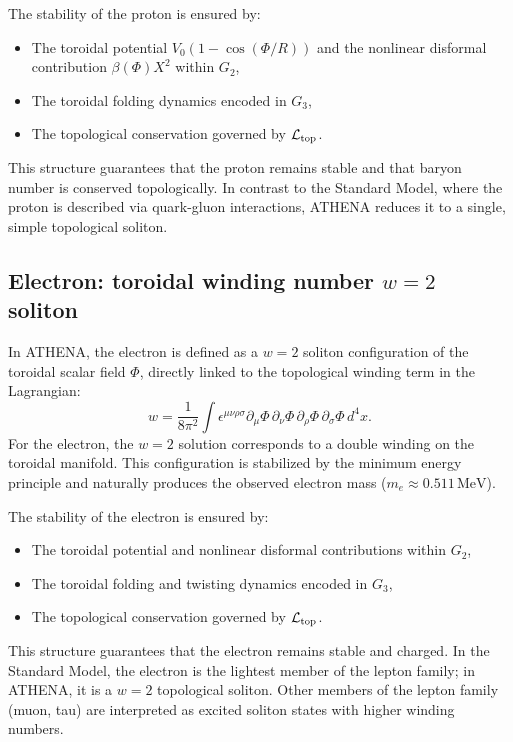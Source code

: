 \documentclass[11pt,a4paper]{article}
\begin{document}
The stability of the proton is ensured by:
\begin{itemize}
    \item The toroidal potential \(V_0 (1 - \cos(\Phi / R))\) and the nonlinear disformal contribution \(\beta(\Phi) X^2\) within \(G_2\),
    \item The toroidal folding dynamics encoded in \(G_3\),
    \item The topological conservation governed by \(\mathcal{L}_{\rm top}\).
\end{itemize}
This structure guarantees that the proton remains stable and that baryon number is conserved topologically. In contrast to the Standard Model, where the proton is described via quark-gluon interactions, ATHENA reduces it to a single, simple topological soliton.

\subsection{Electron: toroidal winding number \(w=2\) soliton}
\label{subsec:electron}
In ATHENA, the electron is defined as a \(w=2\) soliton configuration of the toroidal scalar field \(\Phi\), directly linked to the topological winding term in the Lagrangian:
\[
w = \frac{1}{8\pi^2} \int \epsilon^{\mu\nu\rho\sigma} \partial_\mu \Phi \, \partial_\nu \Phi \, \partial_\rho \Phi \, \partial_\sigma \Phi \, d^4x.
\]
For the electron, the \(w=2\) solution corresponds to a double winding on the toroidal manifold. This configuration is stabilized by the minimum energy principle and naturally produces the observed electron mass (\(m_e \approx 0.511\,\mathrm{MeV}\)).

The stability of the electron is ensured by:
\begin{itemize}
    \item The toroidal potential and nonlinear disformal contributions within \(G_2\),
    \item The toroidal folding and twisting dynamics encoded in \(G_3\),
    \item The topological conservation governed by \(\mathcal{L}_{\rm top}\).
\end{itemize}
This structure guarantees that the electron remains stable and charged. In the Standard Model, the electron is the lightest member of the lepton family; in ATHENA, it is a \(w=2\) topological soliton. Other members of the lepton family (muon, tau) are interpreted as excited soliton states with higher winding numbers.
\end{document}
